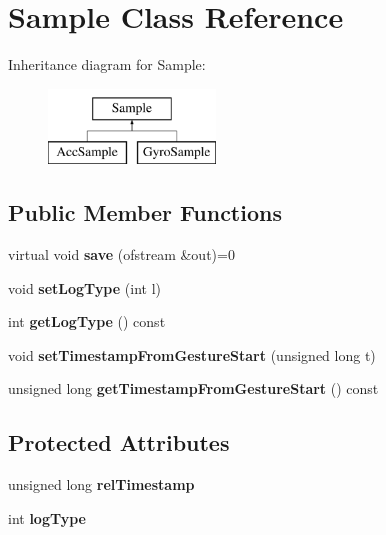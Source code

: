 \hypertarget{class_sample}{\section{Sample Class Reference}
\label{class_sample}
}
Inheritance diagram for Sample\-:\begin{figure}[H]
\begin{center}
\leavevmode
\includegraphics[height=2.000000cm]{class_sample}
\end{center}
\end{figure}
\subsection*{Public Member Functions}
\begin{DoxyCompactItemize}
\item 
\hypertarget{class_sample_a4f65c4a8bb86396782450121c7dc5ba5}{virtual void {\bfseries save} (ofstream \&out)=0}\label{class_sample_a4f65c4a8bb86396782450121c7dc5ba5}

\item 
\hypertarget{class_sample_ae728243bef5e290d46a2851ea2ce5fe2}{void {\bfseries set\-Log\-Type} (int l)}\label{class_sample_ae728243bef5e290d46a2851ea2ce5fe2}

\item 
\hypertarget{class_sample_aafff0e8223f3eafa001611a63f194c8a}{int {\bfseries get\-Log\-Type} () const }\label{class_sample_aafff0e8223f3eafa001611a63f194c8a}

\item 
\hypertarget{class_sample_a05edd06782fa94517b8daeb29e12057d}{void {\bfseries set\-Timestamp\-From\-Gesture\-Start} (unsigned long t)}\label{class_sample_a05edd06782fa94517b8daeb29e12057d}

\item 
\hypertarget{class_sample_a94a34fe92c0f8a89485042aaea458d94}{unsigned long {\bfseries get\-Timestamp\-From\-Gesture\-Start} () const }\label{class_sample_a94a34fe92c0f8a89485042aaea458d94}

\end{DoxyCompactItemize}
\subsection*{Protected Attributes}
\begin{DoxyCompactItemize}
\item 
\hypertarget{class_sample_a24ea733ab0a815949a57aca2a4740e33}{unsigned long {\bfseries rel\-Timestamp}}\label{class_sample_a24ea733ab0a815949a57aca2a4740e33}

\item 
\hypertarget{class_sample_a3a6454628c790459f41de5c83bf3ec7c}{int {\bfseries log\-Type}}\label{class_sample_a3a6454628c790459f41de5c83bf3ec7c}

\end{DoxyCompactItemize}


